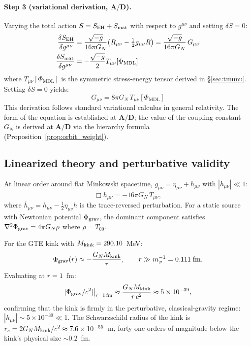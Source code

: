 \documentclass[11pt]{article}
\theoremstyle{remark}
\newcommand{\PHIMDL}{\Phi_{\mathrm{MDL}}}
\newcommand{\Mkink}{M_{\rm kink}}
\newcommand{\CatAD}{\textbf{A/D}}
\newcommand{\Tmunu}{T_{\mu\nu}}
\newcommand{\hmunu}{h_{\mu\nu}}
\newcommand{\GN}{G_N}
\begin{document}
\paragraph{Step 3 (variational derivation, $\CatAD$).}
Varying the total action $S = S_{\rm EH} + S_{\rm mat}$ with respect to
$g^{\mu\nu}$ and setting $\delta S = 0$:
\begin{align}
  \frac{\delta S_{\rm EH}}{\delta g^{\mu\nu}} &=
  \frac{\sqrt{-g}}{16\pi\GN}\bigl(R_{\mu\nu} - \tfrac{1}{2}g_{\mu\nu}R\bigr)
  = \frac{\sqrt{-g}}{16\pi\GN}\,G_{\mu\nu}
\label{eq:vary_EH}\\
  \frac{\delta S_{\rm mat}}{\delta g^{\mu\nu}} &=
  -\frac{\sqrt{-g}}{2}\Tmunu[\PHIMDL]
\label{eq:vary_mat}
\end{align}
where $\Tmunu[\PHIMDL]$ is the symmetric stress-energy tensor derived in
\S\ref{sec:tmunu}.
Setting $\delta S = 0$ yields:
\begin{equation}
  \boxed{G_{\mu\nu} = 8\pi\GN\,\Tmunu[\PHIMDL]}
\label{eq:efe}
\end{equation}
This derivation follows standard variational calculus in general relativity.
The form of the equation is established at $\CatAD$; the value of the coupling
constant $\GN$ is derived at $\CatAD$ via the hierarchy formula
(Proposition~\ref{prop:orbit_weight}).

\subsection{Linearized theory and perturbative validity}

At linear order around flat Minkowski spacetime, $g_{\mu\nu} = \eta_{\mu\nu} + \hmunu$
with $|\hmunu| \ll 1$:
\begin{equation}
  \Box\bar{h}_{\mu\nu} = -16\pi\GN\,\Tmunu,
\label{eq:linearized}
\end{equation}
where $\bar{h}_{\mu\nu} = \hmunu - \tfrac{1}{2}\eta_{\mu\nu}h$ is the trace-reversed
perturbation.
For a static source with Newtonian potential $\Phi_{\rm grav}$, the dominant
component satisfies $\nabla^2\Phi_{\rm grav} = 4\pi\GN\rho$ where $\rho = T_{00}$.

For the GTE kink with $\Mkink = 290.10$~MeV:
\begin{equation}
  \Phi_{\rm grav}(r) \approx -\frac{\GN \Mkink}{r},
\qquad r \gg m_\varphi^{-1} = 0.111\;\text{fm}.
\label{eq:newton}
\end{equation}
Evaluating at $r = 1$~fm:
\begin{equation}
  |\Phi_{\rm grav}/c^2|\big|_{r=1\,\text{fm}} \approx \frac{\GN \Mkink}{r\,c^2}
  \approx 5\times10^{-39},
\label{eq:h_bound}
\end{equation}
confirming that the kink is firmly in the perturbative, classical-gravity regime:
$|h_{\mu\nu}| \sim 5\times10^{-39} \ll 1$.
The Schwarzschild radius of the kink is $r_s = 2\GN\Mkink/c^2 \approx 7.6\times10^{-55}$~m,
forty-one orders of magnitude below the kink's physical size $\sim 0.2$~fm.
\end{document}
